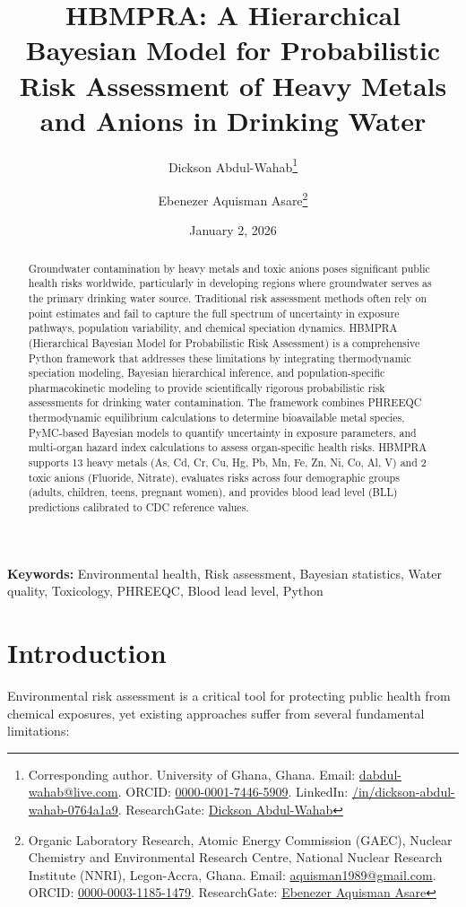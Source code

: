\documentclass[11pt,a4paper]{article}
\title{\textbf{HBMPRA: A Hierarchical Bayesian Model for Probabilistic Risk Assessment of Heavy Metals and Anions in Drinking Water}}
\author[1]{Dickson Abdul-Wahab\thanks{Corresponding author. University of Ghana, Ghana. Email: \href{mailto:dabdul-wahab@live.com}{dabdul-wahab@live.com}. ORCID: \href{https://orcid.org/0000-0001-7446-5909}{0000-0001-7446-5909}. LinkedIn: \href{https://www.linkedin.com/in/dickson-abdul-wahab-0764a1a9}{/in/dickson-abdul-wahab-0764a1a9}. ResearchGate: \href{https://www.researchgate.net/profile/Dickson-Abdul-Wahab}{Dickson Abdul-Wahab}}}
\author[2]{Ebenezer Aquisman Asare\thanks{Organic Laboratory Research, Atomic Energy Commission (GAEC), Nuclear Chemistry and Environmental Research Centre, National Nuclear Research Institute (NNRI), Legon-Accra, Ghana. Email: \href{mailto:aquisman1989@gmail.com}{aquisman1989@gmail.com}. ORCID: \href{https://orcid.org/0000-0003-1185-1479}{0000-0003-1185-1479}. ResearchGate: \href{https://www.researchgate.net/profile/Ebenezer-Aquisman-Asare}{Ebenezer Aquisman Asare}}}
\affil[1]{University of Ghana, Ghana}
\affil[2]{Organic Laboratory Research, Atomic Energy Commission (GAEC), Nuclear Chemistry and Environmental Research Centre, National Nuclear Research Institute (NNRI), Legon-Accra, Ghana}
\date{January 2, 2026}
\begin{document}
\maketitle

\begin{abstract}
Groundwater contamination by heavy metals and toxic anions poses significant public health risks worldwide, particularly in developing regions where groundwater serves as the primary drinking water source. Traditional risk assessment methods often rely on point estimates and fail to capture the full spectrum of uncertainty in exposure pathways, population variability, and chemical speciation dynamics. HBMPRA (Hierarchical Bayesian Model for Probabilistic Risk Assessment) is a comprehensive Python framework that addresses these limitations by integrating thermodynamic speciation modeling, Bayesian hierarchical inference, and population-specific pharmacokinetic modeling to provide scientifically rigorous probabilistic risk assessments for drinking water contamination. The framework combines PHREEQC thermodynamic equilibrium calculations to determine bioavailable metal species, PyMC-based Bayesian models to quantify uncertainty in exposure parameters, and multi-organ hazard index calculations to assess organ-specific health risks. HBMPRA supports 13 heavy metals (As, Cd, Cr, Cu, Hg, Pb, Mn, Fe, Zn, Ni, Co, Al, V) and 2 toxic anions (Fluoride, Nitrate), evaluates risks across four demographic groups (adults, children, teens, pregnant women), and provides blood lead level (BLL) predictions calibrated to CDC reference values.
\end{abstract}

\noindent\textbf{Keywords:} Environmental health, Risk assessment, Bayesian statistics, Water quality, Toxicology, PHREEQC, Blood lead level, Python

\section{Introduction}

Environmental risk assessment is a critical tool for protecting public health from chemical exposures, yet existing approaches suffer from several fundamental limitations:
\end{document}
